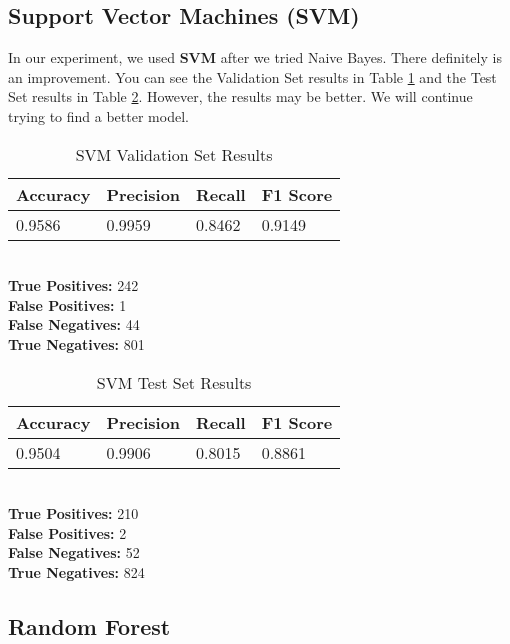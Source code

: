 \documentclass[conference]{IEEEtran}
\begin{document}
\subsection{Support Vector Machines (SVM)} 

In our experiment, we used \textbf{SVM} after we tried Naive Bayes. There definitely is an improvement. You can see the Validation Set results in Table \ref{tab:svm1} and the Test Set results in Table \ref{tab:svm2}. However, the results may be better. We will continue trying to find a better model.

\begin{table}[H]
    \caption{SVM Validation Set Results}

    \begin{tabularx}{\linewidth}{|X|X|X|X|}
        \hline
        \textbf{Accuracy} & \textbf{Precision} & \textbf{Recall} & \textbf{F1 Score} \\
        \hline
        0.9586 & 0.9959 & 0.8462 & 0.9149 \\
        \hline
    \end{tabularx}\\

    \textbf{True Positives:} 242\\
    \textbf{False Positives:} 1\\
    \textbf{False Negatives:} 44\\
    \textbf{True Negatives:} 801
    \label{tab:svm1}
\end{table}

\begin{table}[H]
    \caption{SVM Test Set Results}

    \begin{tabularx}{\linewidth}{|X|X|X|X|}
        \hline
        \textbf{Accuracy} & \textbf{Precision} & \textbf{Recall} & \textbf{F1 Score} \\
        \hline
        0.9504 & 0.9906 & 0.8015 & 0.8861 \\
        \hline
    \end{tabularx}\\

    \textbf{True Positives:} 210\\
    \textbf{False Positives:} 2\\
    \textbf{False Negatives:} 52\\
    \textbf{True Negatives:} 824
    \label{tab:svm2}
\end{table}

\subsection{Random Forest}
\end{document}
